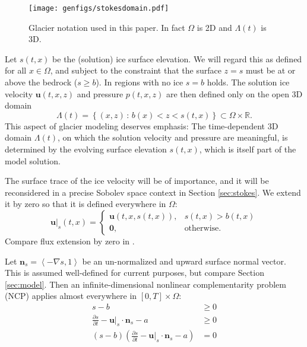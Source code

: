 \documentclass[hidelinks,onefignum,onetabnum,final]{siamart220329}  %
\newcommand{\RR}{\mathbb{R}}
\newcommand{\grad}{\nabla}
\newcommand{\bn}{\mathbf{n}}
\newcommand{\bu}{\mathbf{u}}
\newcommand{\bzero}{\bm{0}}
\begin{document}
\begin{figure}[ht]
\centering
\texttt{[image: genfigs/stokesdomain.pdf]}
\caption{Glacier notation used in this paper.  In fact $\Omega$ is 2D and $\Lambda(t)$ is 3D.}
\label{fig:stokesdomain}
\end{figure}

Let $s(t,x)$ be the (solution) ice surface elevation.  We will regard this as defined for all $x\in\Omega$, and subject to the constraint that the surface $z=s$ must be at or above the bedrock ($s \ge b$).  In regions with no ice $s=b$ holds.  The solution ice velocity $\bu(t,x,z)$ and pressure $p(t,x,z)$ are then defined only on the open 3D domain
\begin{equation}
\Lambda(t) = \left\{(x,z)\,:\,b(x) < z < s(t,x)\right\} \subset \Omega \times \RR. \label{eq:icydomain}
\end{equation}
This aspect of glacier modeling deserves emphasis:  The time-dependent 3D domain $\Lambda(t)$, on which the solution velocity and pressure are meaningful, is determined by the evolving surface elevation $s(t,x)$, which is itself part of the model solution.

The surface trace of the ice velocity will be of importance, and it will be reconsidered in a precise Sobolev space context in Section \ref{sec:stokes}.  We extend it by zero so that it is defined everywhere in $\Omega$:
\begin{equation}
\bu|_s(t,x) = \begin{cases} \bu(t,x,s(t,x)), & s(t,x)>b(t,x) \\
                            \bzero, & \text{otherwise} .\end{cases} \label{eq:defineus}
\end{equation}
Compare flux extension by zero in \cite{SchoofHewitt2013}.

Let $\bn_s = \left<-\grad s,1\right>$ be an un-normalized and upward surface normal vector.  This is assumed well-defined for current purposes, but compare Section \ref{sec:model}.  Then an infinite-dimensional nonlinear complementarity problem (NCP) \cite{Bueler2021conservation,FacchineiPang2003,SchoofHewitt2013} applies almost everywhere in $[0,T]\times \Omega$:
\begin{subequations}
\label{eq:ncp}
\begin{align}
s - b &\ge 0 \\
\frac{\partial s}{\partial t} - \bu|_s \cdot \bn_s - a &\ge 0 \\
(s - b) \left(\frac{\partial s}{\partial t} - \bu|_s \cdot \bn_s - a\right) &= 0
\end{align}
\end{subequations}
\end{document}
